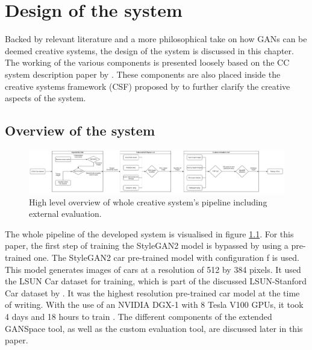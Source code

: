 \chapter{Design of the system}
\label{ch:design_of_system}


Backed by relevant literature and a more philosophical take on how GANs can be deemed creative systems, the design of the system is discussed in this chapter.
The working of the various components is presented loosely based on the CC system description paper by \citet{ventura}.
These components are also placed inside the creative systems framework (CSF) proposed by \citet{csf} to further clarify the creative aspects of the system.

\section{Overview of the system}
\label{sec:overview_system}

\begin{figure}[H]
    \centering
    \includegraphics[width=\linewidth]{images/system_overview.png}
    \captionsetup{width=0.7\linewidth}
    \captionsetup{justification=centering}
    \caption{ High level overview of whole creative system's pipeline including external evaluation.  }
    \label{fig:system_pipeline}
\end{figure}

The whole pipeline of the developed system is visualised in figure \ref{fig:system_pipeline}.
For this paper, the first step of training the StyleGAN2 model is bypassed by using a pre-trained one.
The StyleGAN2 car pre-trained model with configuration f is used.
This model generates images of cars at a resolution of 512 by 384 pixels.
It used the LSUN Car dataset for training, which is part of the discussed LSUN-Stanford Car dataset by \citet{cardb}.
It was the highest resolution pre-trained car model at the time of writing.
With the use of an NVIDIA DGX-1 with 8 Tesla V100 GPUs, it took 4 days and 18 hours to train \citep{stylegan2}.
The different components of the extended GANSpace tool, as well as the custom evaluation tool, are discussed later in this paper.

